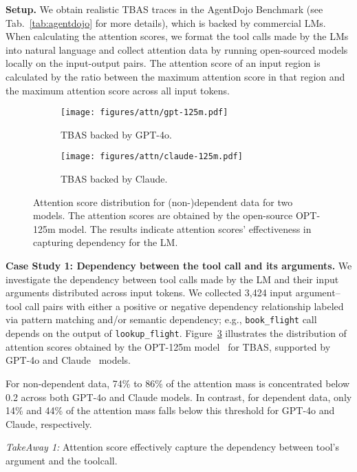 \textbf{Setup.}  We obtain realistic TBAS traces in the AgentDojo Benchmark (see Tab.~\ref{tab:agentdojo} for more details), which is backed by commercial LMs. When calculating the attention scores, we format the tool calls made by the LMs into natural language and collect attention data by running open-sourced models locally on the input-output pairs. The attention score of an input region is calculated by the ratio between the maximum attention score in that region and the maximum attention score across all input tokens. 
\begin{figure}[t]
    \centering
    \begin{subfigure}[b]{0.22\textwidth}
         \centering
         \texttt{[image: figures/attn/gpt-125m.pdf]}
         \caption{TBAS backed by GPT-4o.}
         \label{fig:gpt-4o}
     \end{subfigure}
     \hfill
    \begin{subfigure}[b]{0.22\textwidth}
         \centering
         \texttt{[image: figures/attn/claude-125m.pdf]}
         \caption{TBAS backed by Claude.}
         \label{fig:Claude}
     \end{subfigure}
    \caption{Attention score distribution for (non-)dependent data for two models. The attention scores are obtained by the open-source OPT-125m model. The results indicate attention scores' effectiveness in capturing dependency for the LM.}
    \label{fig:attn-args}
\end{figure}

\textbf{Case Study 1: Dependency between the tool call and its arguments.} 
We investigate the dependency between tool calls made by the LM and their input arguments distributed across input tokens. We collected 3,424 input argument–tool call pairs with either a positive or negative dependency relationship labeled via pattern matching and/or semantic dependency; e.g., \texttt{book\_flight} call depends on the output of \texttt{lookup\_flight}. Figure~\ref{fig:attn-args} illustrates the distribution of attention scores obtained by the OPT-125m model~\cite{zhang2022opt} for TBAS, supported by GPT-4o and Claude~\cite{anthropic2023claude} models.

For non-dependent data, 74\% to 86\% of the attention mass is concentrated below 0.2 across both GPT-4o and Claude models. In contrast, for dependent data, only 14\% and 44\% of the attention mass falls below this threshold for GPT-4o and Claude, respectively.


\textit{TakeAway 1:} Attention score effectively capture the dependency between tool's argument and the toolcall.  

